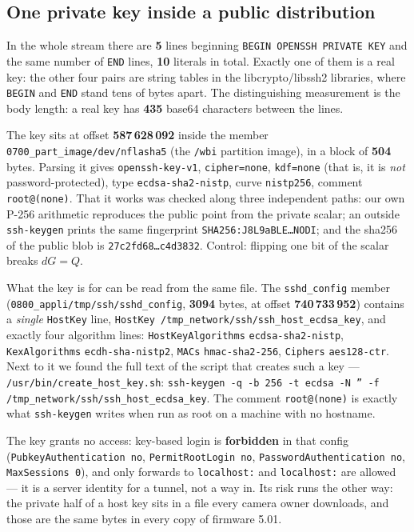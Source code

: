 \documentclass[12pt]{article}
\newcommand{\code}[1]{\texttt{\small #1}}
\newcommand{\lc}[1]{\texttt{\small #1}}
\newcommand{\hx}[1]{\texttt{\footnotesize #1}}
\begin{document}
\subsection{One private key inside a public distribution}
\label{sec:key}

In the whole stream there are \textbf{5} lines beginning \code{BEGIN OPENSSH PRIVATE KEY} and
the same number of \code{END} lines, \textbf{10} literals in total. Exactly one of them is a
real key: the other four pairs are string tables in the libcrypto/libssh2 libraries, where
\code{BEGIN} and \code{END} stand tens of bytes apart. The distinguishing measurement is the
body length: a real key has \textbf{435} base64 characters between the lines.

The key sits at offset \textbf{587\,628\,092} inside the member
\code{0700\_part\_image/dev/nflasha5} (the \code{/wbi} partition image), in a block of
\textbf{504} bytes. Parsing it gives
\code{openssh-key-v1}, \code{cipher=none}, \code{kdf=none} (that is, it is \emph{not}
password-protected), type \lc{ecdsa-sh\allowbreak a2-nistp}, curve \code{nistp256}, comment
\code{root@(none)}. That it works was checked along three independent paths: our own P-256
arithmetic reproduces the public point from the private scalar; an outside \code{ssh-keygen}
prints the same fingerprint \hx{SHA256:J8L9aBLE\ldots NODI}; and the sha256 of the public blob
is \hx{27c2fd68\ldots c4d3832}. Control: flipping one bit of the scalar breaks $dG = Q$.

What the key is for can be read from the same file. The \code{sshd\_config} member
(\code{0800\_appli/tmp/ssh/sshd\_config}, \textbf{3094} bytes, at offset
\textbf{740\,733\,952}) contains a \emph{single} \code{HostKey} line,
\code{HostKey /tmp\_network/ssh/ssh\_host\_ecdsa\_key}, and exactly four algorithm lines:
\code{HostKeyAlgorithms} \lc{ecdsa-sh\allowbreak a2-nistp}, \code{KexAlgorithms}
\lc{ecdh-sha-nistp2}, \code{MACs} \code{hmac-sha2-256}, \code{Ciphers}
\code{aes128-ctr}. Next to it we found the full text of the script that creates such a key ---
\code{/usr/bin/create\_host\_key.sh}: \code{ssh-keygen -q -b 256 -t ecdsa -N '' -f
/tmp\_network/ssh/ssh\_host\_ecdsa\_key}. The comment \code{root@(none)} is exactly what
\code{ssh-keygen} writes when run as root on a machine with no hostname.

The key grants no access: key-based login is \textbf{forbidden} in that config
(\lc{PubkeyAu\allowbreak thentica\allowbreak tion no}, \lc{PermitRo\allowbreak otLogin \allowbreak no},
\lc{Password\allowbreak Authentication \allowbreak no}, \code{MaxSessions 0}), and only forwards to \code{localhost:} and \code{localhost:}
are allowed --- it is a server identity for a tunnel, not a way in. Its risk runs the other
way: the private half of a host key sits in a file every camera owner downloads, and those are
the same bytes in every copy of firmware 5.01.
\end{document}

